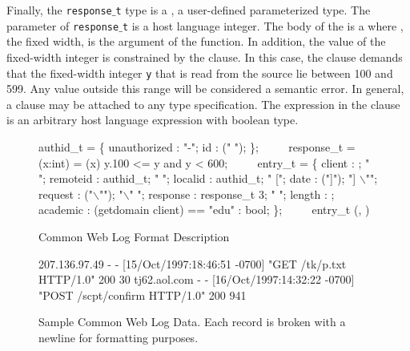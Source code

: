 Finally, the {\tt response$\_$t} type is a \Pfun, a user-defined
parameterized type.  The parameter of {\tt response$\_$t} is a host
language integer.  The body of the \Pfun{} is a 
where , the fixed width, is the argument of the function.  In
addition, the value of the fixed-width integer is constrained by the
\Pwhere{} clause.  In this case, the \Pwhere{} clause demands that
the fixed-width integer {\tt y} that is read from the source lie 
between 100 and 599.
Any value outside this range will be considered a semantic error.
In general, a \Pwhere{} clause may be attached to 
any type specification.  The expression in the \Pwhere{} clause
is an arbitrary host language expression with boolean type.


\begin{figure}
{\small
\begin{code}
authid\_t = \Punion{} \{
  unauthorized : "-";
  id           : \Pstring (" ");
\};
\(\qquad\)
response\_t =
  \Pfun(x:int) =
   (x) \Pwhere{} y.100 <= y and y < 600;
\(\qquad\)
entry\_t = \Pstruct{} \{
  client   : \Pip{};             " ";
  remoteid : authid\_t;        " ";
  localid  : authid\_t;        " [";
  date     : \Pdate("]");      "] \(\backslash\)"";
  request  : \Pstring("\(\backslash\)"");   "\(\backslash\)" ";
  response : response\_t 3;    " "; 
  length   : \Puint{};
  academic : \Pcompute 
             (getdomain client) == "edu" : bool;
\};
\(\qquad\)
entry\_t \Parray{}(\Peor, \Peof)
\end{code}

\caption{\ipads{} Common Web Log Format Description}
\label{fig:ipads-clf}
}
\end{figure}

\begin{figure}
{\small
\begin{code}
{}207.136.97.49 - - [15/Oct/1997:18:46:51 -0700] 
"GET /tk/p.txt HTTP/1.0" 200 30
tj62.aol.com - - [16/Oct/1997:14:32:22 -0700] 
"POST /scpt/confirm HTTP/1.0" 200 941
\end{code}
\caption{Sample Common Web Log Data. Each record is broken with a
  newline for formatting purposes.}
\label{fig:ipads-clf-data}
}
\end{figure}

